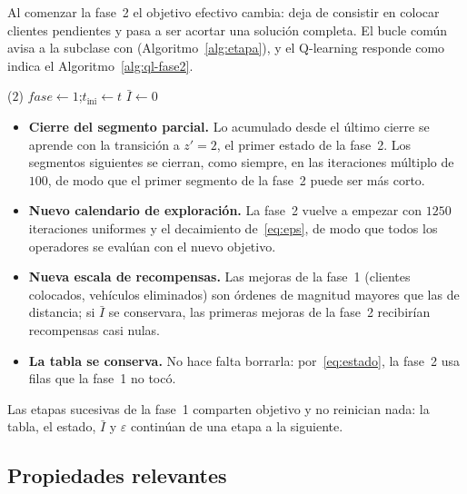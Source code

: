 Al comenzar la fase~2 el objetivo efectivo cambia: deja de consistir en colocar clientes
pendientes y pasa a ser acortar una solución completa. El bucle común avisa a la subclase con
 (Algoritmo~\ref{alg:etapa}), y el Q-learning responde como indica el
Algoritmo~\ref{alg:ql-fase2}.

\begin{algorithm}[H]
\caption{Inicio de la fase 2 en el Q-learning ()}
\label{alg:ql-fase2}
($2$) 
$\textit{fase}\gets 1$;\quad $t_{\mathrm{ini}}\gets t$ 
$\bar{I}\gets 0$ 
\end{algorithm}

\begin{itemize}
\item \textbf{Cierre del segmento parcial.} Lo acumulado desde el último cierre se aprende con
la transición a $z'=2$, el primer estado de la fase~2. Los segmentos siguientes se cierran,
como siempre, en las iteraciones múltiplo de $100$, de modo que el primer segmento de la
fase~2 puede ser más corto.
\item \textbf{Nuevo calendario de exploración.} La fase~2 vuelve a empezar con
$1250$ iteraciones uniformes y el decaimiento de~\eqref{eq:eps}, de modo que todos los
operadores se evalúan con el nuevo objetivo.
\item \textbf{Nueva escala de recompensas.} Las mejoras de la fase~1 (clientes colocados,
vehículos eliminados) son órdenes de magnitud mayores que las de distancia; si $\bar{I}$ se
conservara, las primeras mejoras de la fase~2 recibirían recompensas casi nulas.
\item \textbf{La tabla se conserva.} No hace falta borrarla: por~\eqref{eq:estado}, la
fase~2 usa filas que la fase~1 no tocó.
\end{itemize}
Las etapas sucesivas de la fase~1 comparten objetivo y no reinician nada: la tabla, el estado,
$\bar{I}$ y $\varepsilon$ continúan de una etapa a la siguiente.

\subsection{Propiedades relevantes}

